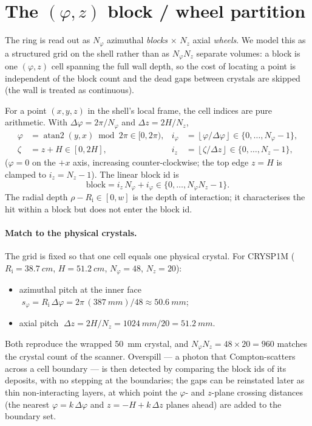 \documentclass[11pt]{article}
\newcommand{\Ri}{R_{\mathrm{i}}}
\begin{document}
\section{The $(\varphi,z)$ block / wheel partition}
\label{sec:grid}

The ring is read out as $N_\varphi$ azimuthal \emph{blocks} $\times$ $N_z$ axial
\emph{wheels}. We model this as a structured grid on the shell rather than as
$N_\varphi N_z$ separate volumes: a block is one $(\varphi,z)$ cell spanning the full
wall depth, so the cost of locating a point is independent of the block count and the
dead gaps between crystals are skipped (the wall is treated as continuous).

For a point $(x,y,z)$ in the shell's local frame, the cell indices are pure
arithmetic. With $\Delta\varphi = 2\pi/N_\varphi$ and $\Delta z = 2H/N_z$,
\begin{align}
  \varphi &= \operatorname{atan2}(y,x) \bmod 2\pi \in [0,2\pi), &
  i_\varphi &= \left\lfloor \varphi/\Delta\varphi \right\rfloor \in \{0,\dots,N_\varphi-1\},\\
  \zeta &= z + H \in [0,2H], &
  i_z &= \left\lfloor \zeta/\Delta z \right\rfloor \in \{0,\dots,N_z-1\},
\end{align}
($\varphi=0$ on the $+x$ axis, increasing counter-clockwise; the top edge $z=H$ is
clamped to $i_z=N_z-1$). The linear block id is
\begin{equation}
  \mathrm{block} = i_z\,N_\varphi + i_\varphi \in \{0,\dots,N_\varphi N_z - 1\}.
\end{equation}
The radial depth $\rho-\Ri\in[0,w]$ is the depth of interaction; it characterises the
hit within a block but does not enter the block id.

\paragraph{Match to the physical crystals.} The grid is fixed so that one cell equals
one physical crystal. For CRYSP1M ($\Ri=\SI{38.7}{cm}$, $H=\SI{51.2}{cm}$,
$N_\varphi=48$, $N_z=20$):
\begin{itemize}[nosep]
\item azimuthal pitch at the inner face $\;s_\varphi = \Ri\,\Delta\varphi
  = 2\pi\,(\SI{387}{mm})/48 \approx \SI{50.6}{mm}$;
\item axial pitch $\;\Delta z = 2H/N_z = \SI{1024}{mm}/20 = \SI{51.2}{mm}$.
\end{itemize}
Both reproduce the wrapped \SI{50}{mm} crystal, and $N_\varphi N_z = 48\times20 = 960$
matches the crystal count of the scanner. Overspill --- a photon that Compton-scatters
across a cell boundary --- is then detected by comparing the block ids of its
deposits, with no stepping at the boundaries; the gaps can be reinstated later as thin
non-interacting layers, at which point the $\varphi$- and $z$-plane crossing distances
(the nearest $\varphi=k\,\Delta\varphi$ and $z=-H+k\,\Delta z$ planes ahead) are added
to the boundary set.
\end{document}
